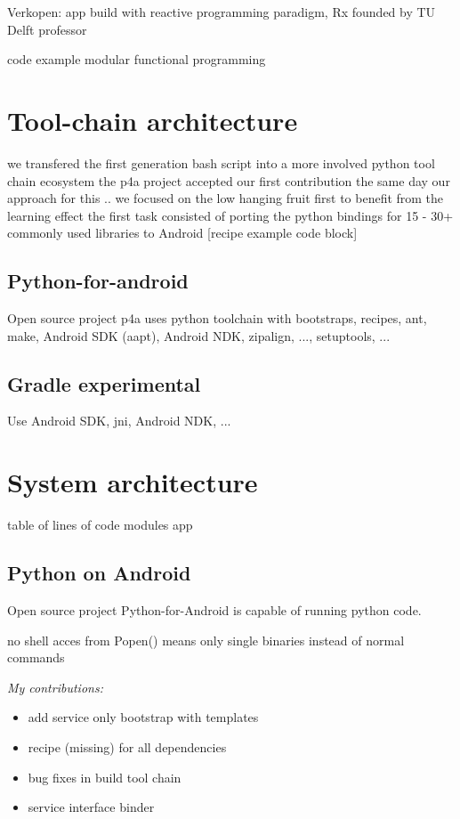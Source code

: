 Verkopen: app build with reactive programming paradigm, Rx founded by TU Delft professor

code example
modular functional programming



\section{Tool-chain architecture}


we transfered the first generation bash script into a more involved python tool chain ecosystem
the p4a project accepted our first contribution the same day
our approach for this .. we focused on the low hanging fruit first to benefit from the learning effect
the first task consisted of porting the python bindings for 15 - 30+ commonly used libraries to Android [recipe example code block]

\subsection{Python-for-android}
Open source project p4a uses python toolchain with bootstraps, recipes, ant, make, Android SDK (aapt), Android NDK, zipalign, ..., setuptools, ...

\subsection{Gradle experimental}
Use Android SDK, jni, Android NDK, ...


\section{System architecture}
table of lines of code
modules app

\subsection{Python on Android}
Open source project Python-for-Android is capable of running python code.

no shell acces from Popen() means only single binaries instead of normal commands

\emph{My contributions:}
\begin{itemize}
	\item add service only bootstrap with templates
	\item recipe (missing) for all dependencies
	\item bug fixes in build tool chain
	\item service interface binder
\end{itemize}


